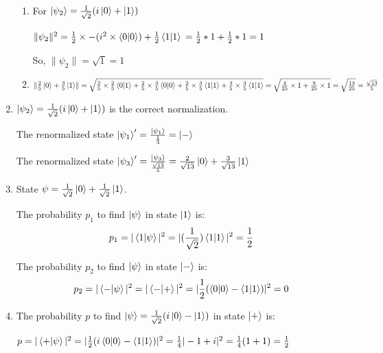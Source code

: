 \documentclass{article}
\begin{document}
\begin{enumerate}
\begin{enumerate}
              \item For $\ket{\psi_2}=\frac{1}{\sqrt{2}}(i\ket{0}+\ket{1})$

                    $\lVert\psi_2\rVert^2
                        \\=\frac{1}{2}\times -(i^2\times\braket{0|0})+\frac{1}{2}\braket{1|1}
                        \\=\frac{1}{2}*1+\frac{1}{2}*1
                        \\=1
                    $

                    So, $\lVert\psi_2\rVert=\sqrt{1}=1$
              \item $\lVert\frac{2}{5}\ket{0}+\frac{3}{5}\ket{1}\rVert
                        \\=\sqrt{\frac{2}{5}\times\frac{2}{5}\braket{0|1}+\frac{2}{5}\times\frac{3}{5}\braket{0|0}+\frac{2}{5}\times\frac{3}{5}\braket{1|1}+\frac{3}{5}\times\frac{3}{5}\braket{1|1}}
                        \\=\sqrt{\frac{4}{25}\times1+\frac{9}{25}\times1}
                        \\=\sqrt{\frac{13}{25}}
                        \\=\frac{\sqrt{13}}{5}
                    $
          \end{enumerate}
    \item $\ket{\psi_2}=\frac{1}{\sqrt{2}}(i\ket{0}+\ket{1})$ is the correct normalization.

          The renormalized state $\ket{\psi_1}'=\frac{\ket{\psi_1}}{\frac{1}{3}}=\ket{-}$

          The renormalized state $\ket{\psi_3}'=\frac{\ket{\psi_3}}{\frac{\sqrt{13}}{5}}=\frac{2}{\sqrt{13}}\ket{0}+\frac{3}{\sqrt{13}}\ket{1}$
    \item State $\psi=\frac{1}{\sqrt{2}}\ket{0}+\frac{1}{\sqrt{2}}\ket{1}$.

          The probability $p_1$ to find $\ket{\psi}$ in state $\ket{1}$ is:
          \[p_1=|\braket{1|\psi}|^2=|(\frac{1}{\sqrt{2}})\braket{1|1}|^2=\frac{1}{2}\]


          The probability $p_2$ to find $\ket{\psi}$ in state $\ket{-}$ is:
          \[p_2=|\braket{-|\psi}|^2=|\braket{-|+}|^2=|\frac{1}{2}(\braket{0|0}-\braket{1|1})|^2=0\]

    \item The probability $p$ to find $\ket{\psi}=\frac{1}{\sqrt{2}}(i\ket{0}-\ket{1})$ in state $\ket{+}$ is:

          $p=|\braket{+|\psi}|^2=|\frac{1}{2}(i\braket{0|0}-\braket{1|1})|^2=\frac{1}{4}|-1+i|^2=\frac{1}{4}(1+1)=\frac{1}{2}$


\end{enumerate}
\end{document}
